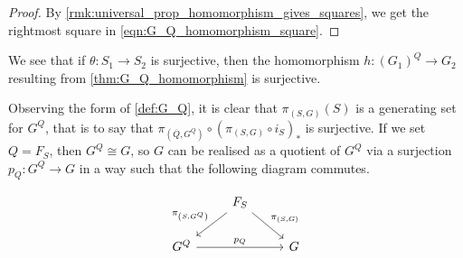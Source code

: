 \begin{proof}
	By \cref{rmk:universal_prop_homomorphism_gives_squares}, we get the rightmost square in \eqref{eqn:G_Q_homomorphism_square}.
\end{proof}

We see that if $\theta \colon S_1 \to S_2$ is surjective, then the homomorphism $h \colon (G_1)^Q \to G_2$ resulting from \cref{thm:G_Q_homomorphism} is surjective.

Observing the form of \cref{def:G_Q}, it is clear that $\pi_{(S,G)}(S)$ is a generating set for $G^Q$, that is to say that $\pi_{(\overline{Q},G^Q)} \circ \left(\pi_{(S,G)} \circ i_S \right)_*$ is surjective.
If we set $Q=F_S$, then $G^Q \cong G$, so $G$ can be realised as a quotient of $G^Q$ via a surjection $p_Q \colon G^Q \to G$ in a way such that the following diagram commutes.

\begin{equation*}
	\begin{tikzcd}
		& F_S \ar[dl, "\pi_{\left(S,G^Q\right)}"'] \ar[dr, "\pi_{\left(S,G\right)}"] &
		\\ G^Q \ar[rr, "p_Q"]  & & G
	\end{tikzcd}
\end{equation*}


